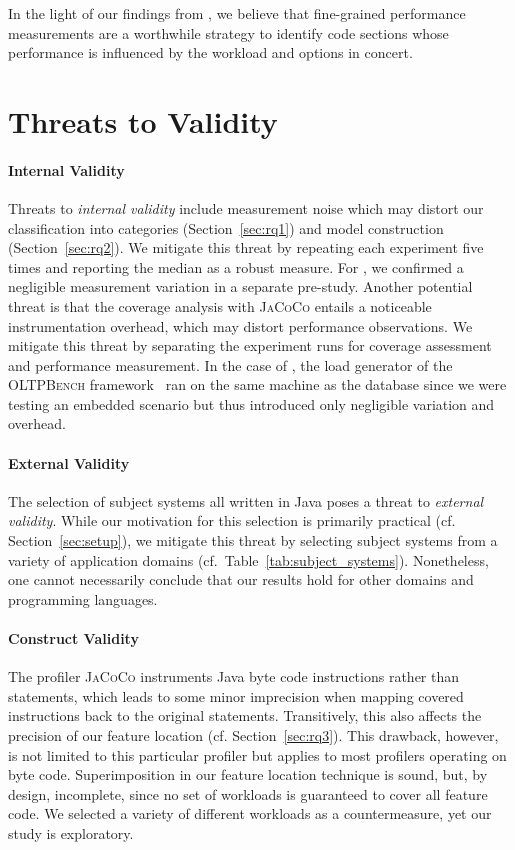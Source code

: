 {In the light of our findings from , we believe that fine-grained performance measurements are a worthwhile strategy to identify code sections whose performance is influenced by the workload and options in concert.

\section{Threats to Validity}\label{sec:threats}

\paragraph*{Internal Validity}\label{sec:internal_validity}
Threats to \emph{internal validity} include measurement noise which may distort our classification into categories (Section~\ref{sec:rq1}) and model construction (Section~\ref{sec:rq2}). We mitigate this threat by repeating each experiment five times and reporting the median as a robust measure. For \htwo, we confirmed a negligible measurement variation in a separate pre-study.
Another potential threat is that the coverage analysis with \mbox{\textsc{JaCoCo}} entails a noticeable instrumentation overhead, which may distort performance observations. We mitigate this threat by separating the experiment runs for coverage assessment and performance measurement. In the case of \htwo, the load generator of the \textsc{OLTPBench} framework~\cite{difallah_oltp_2013} ran on the same machine as the database since we were testing an embedded scenario but thus introduced only negligible variation and overhead.

\paragraph*{External Validity}\label{sec:external_validity}
The selection of subject systems all written in Java poses a threat to \emph{external validity}. While our motivation for this selection is primarily practical (cf. Section~\ref{sec:setup}), we mitigate this threat by selecting subject systems from a variety of application domains (cf.~Table~\ref{tab:subject_systems}). Nonetheless, one cannot necessarily conclude that our results hold for other domains and programming languages. 

\paragraph*{Construct Validity}\label{sec:construct_validity}
The profiler \textsc{JaCoCo} instruments Java byte code instructions rather than statements, which leads to some minor imprecision when mapping covered instructions back to the original statements. Transitively, this also affects the precision of our feature location (cf. Section~\ref{sec:rq3}). This drawback, however, is not limited to this particular profiler but applies to most profilers operating on byte code. 
Superimposition in our feature location technique is sound, but, by design, incomplete, since no set of workloads is guaranteed to cover all feature code. We selected a variety of different workloads as a countermeasure, yet our study is exploratory. 

}
